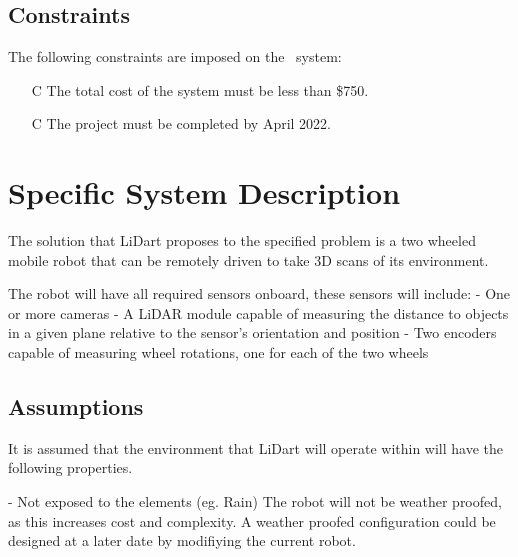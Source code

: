 \documentclass[12pt]{article}
\newcounter{constnum} %
\begin{document}
\subsection{Constraints}


The following constraints are imposed on the \progname\ system:
\noindent \begin{itemize}
\item[C\refstepcounter{constnum}\theconstnum] The total cost of the system must be less than \$750.
\item[C\refstepcounter{constnum}\theconstnum] The project must be completed by April 2022.
\end{itemize}

\section{Specific System Description} 
\label{sec_SpecificDesc}

The solution that LiDart proposes to the specified problem is a two wheeled mobile robot that can be remotely driven to take 3D scans of its environment.

The robot will have all required sensors onboard, these sensors will include:
- One or more cameras
- A LiDAR module capable of measuring the distance to objects in a given plane relative to the sensor's orientation and position 
- Two encoders capable of measuring wheel rotations, one for each of the two wheels

\subsection{Assumptions}

It is assumed that the environment that LiDart will operate within will have the following properties.

- Not exposed to the elements (eg. Rain)
The robot will not be weather proofed, as this increases cost and complexity. A weather proofed configuration could be designed at a later date by modifiying the current robot.
\end{document}
